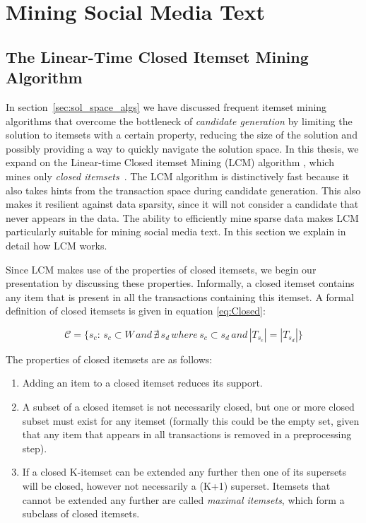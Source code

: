 \documentclass[letterpaper,12pt,titlepage,oneside,final]{book}
\begin{document}
\chapter{Mining Social Media Text}
\label{sec:socmine}


\section{The Linear-Time Closed Itemset Mining \\Algorithm}
\label{sec:lcm}
In section~\ref{sec:sol_space_algs} we have discussed frequent itemset mining algorithms that
overcome the bottleneck of \emph{candidate generation} by 
limiting the solution to itemsets with a certain property, 
reducing the size of the solution and 
possibly providing a way to quickly navigate the solution space. 
In this thesis, we expand on the Linear-time Closed itemset Mining (LCM) algorithm \cite{uno2004lcm}, 
which mines only 
\emph{closed itemsets}~\cite{pasquier1999discovering}.
The  LCM algorithm is distinctively fast because it also 
takes hints from the transaction space 
during candidate generation.
This also makes it resilient against data sparsity,
since it will not consider a candidate that never appears in the data.
The ability to efficiently mine sparse data makes LCM particularly
suitable for mining social media text.
In this section we explain in detail how LCM works.

Since LCM makes use of the properties of closed itemsets, 
we begin our presentation by discussing these properties.
Informally, a closed itemset contains any item that is present in all the transactions
containing this itemset.
A formal definition of closed itemsets is given in equation \ref{eq:Closed}: 

\begin{equation}\label{eq:Closed}\mathcal{C} = \{s_c:\, s_c \subset W \, and \,\nexists \, s_d \, where \, s_c  \subset s_d \, and \, |T_{s_c}| = |T_{s_d}|\}\end{equation}

The properties of closed itemsets are as follows:
\begin{enumerate}
\item Adding an item to a closed itemset reduces its support. 
\item A subset of a closed itemset is not necessarily closed, but one or more closed subset must exist for any itemset (formally this could be the empty set, given that any item that appears in all transactions is removed in a preprocessing step). 
\item If a closed K-itemset can be extended any further then one of its supersets will be closed, however not necessarily a (K+1) superset. Itemsets that cannot be extended any further are called \emph{maximal itemsets}, which form a subclass of closed itemsets.
\end{enumerate}
\end{document}
